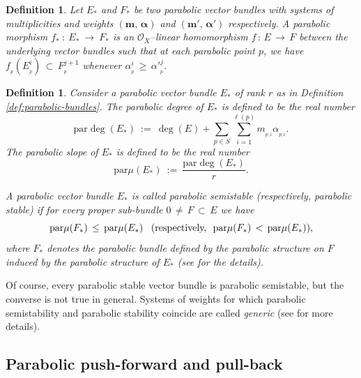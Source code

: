 \documentclass[10pt,reqno]{amsart}
\theoremstyle{myroman}
\newtheorem{definition}[theorem]{Definition}
\numberwithin{equation}{section}
\begin{document}
	\begin{definition}\label{def:parabolic-morphism}
		Let $E_*$ and $F_*$ be two parabolic vector bundles with systems of multiplicities and
		weights $(\boldsymbol{m,\,\alpha})$ and $(\boldsymbol{m',\,\alpha'})$
		respectively. A \textit{parabolic morphism} $f_* \ :\ E_* \ \longrightarrow\ F_*$
		is an ${\mathcal O}_X$--linear homomorphism $f \,:\, E\,\longrightarrow\, F$ between
		the underlying vector bundles such that at each parabolic point $p$, we have $f_{_{p}}(E^i_{_{p}})
		\,\subset\, {F}^{j+1}_{_{p}}$ whenever $\alpha^i_{_{p}}\,\geq\,{\alpha'}^j_{_{p}}$.
	\end{definition}
	
	\begin{definition}\label{def:parabolic-degree-and-slope}
		Consider a parabolic vector bundle $E_*$ of rank $r$ as in Definition \ref{def:parabolic-bundles}. The \textit{parabolic degree} of $E_*$ is defined to be the real number
		\begin{equation}
			\text{par}\deg(E_*)\ :=\ \deg(E)+\sum_{p\in S}\sum_{i=1}^{\ell(p)} m_{_{p,i}}\alpha_{_{p,i}}. 
		\end{equation}
		The \textit{parabolic slope} of $E_*$ is defined to be the real number
		\begin{equation}
			\text{par}\mu(E_*)\ :=\ \frac{\text{par}\deg(E_*)}{r}.
		\end{equation}
		
		A parabolic vector bundle $E_*$ is called \textit{parabolic semistable} (respectively,
		\textit{parabolic stable}) if for every proper sub-bundle $0\, \not=\, F\, \subset\, E$ we have 
		\[
		\textnormal{par}\mu(F_*)\,\leq\, \textnormal{par}\mu(E_*)\ \ \, (\text{respectively, }\
		\textnormal{par}\mu(F_*)\, <\, \textnormal{par}\mu(E_*)),\]
		where $F_*$ denotes the parabolic bundle defined by the parabolic
		structure on $F$ induced by the parabolic structure of $E_*$ (see \cite{MS80} for
		the details).
	\end{definition}
	
	Of course, every parabolic stable vector bundle is parabolic semistable, but the converse is not true in 
	general. Systems of weights for which parabolic semistability and parabolic stability coincide are called 
	\textit{generic} (see \cite{BY99} for more details).
	
	\subsection{Parabolic push-forward and pull-back}\label{parabolic pushforward}
	
\end{document}
